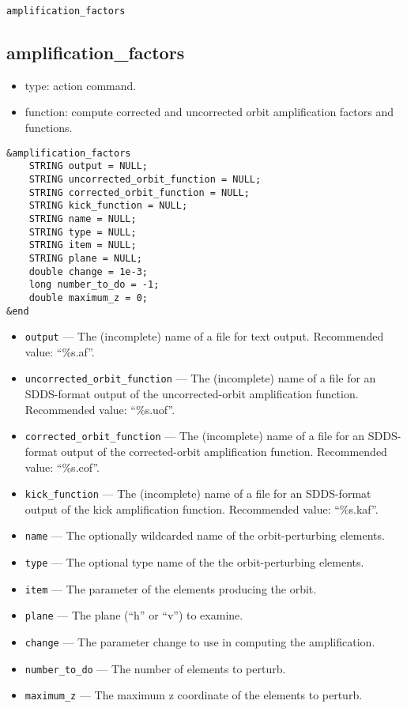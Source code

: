 \documentclass[11pt]{article}
\begin{document}
\begin{latexonly}
\newpage
\begin{center}{\Large\verb|amplification_factors|}\end{center}
\end{latexonly}
\subsection{amplification\_factors}

\begin{itemize}
\item type: action command.
\item function: compute corrected and uncorrected orbit amplification factors and functions.
\end{itemize}

\begin{verbatim}
&amplification_factors
    STRING output = NULL;
    STRING uncorrected_orbit_function = NULL;
    STRING corrected_orbit_function = NULL;
    STRING kick_function = NULL;
    STRING name = NULL;
    STRING type = NULL;
    STRING item = NULL;
    STRING plane = NULL;
    double change = 1e-3;
    long number_to_do = -1;
    double maximum_z = 0;
&end
\end{verbatim}

\begin{itemize}
\item \verb|output| ---  The (incomplete) name of a file for text output.   Recommended value: ``\%s.af''.
\item \verb|uncorrected_orbit_function| --- The (incomplete) name of a file for an SDDS-format output of the
    uncorrected-orbit amplification function.  Recommended value: ``\%s.uof''.
\item \verb|corrected_orbit_function| --- The (incomplete) name of a file for an SDDS-format output of the
    corrected-orbit amplification function.  Recommended value: ``\%s.cof''.
\item \verb|kick_function| --- The (incomplete) name of a file for an SDDS-format output of the kick amplification function.
Recommended value: ``\%s.kaf''.
\item \verb|name| --- The optionally wildcarded name of the orbit-perturbing elements.  
\item \verb|type| --- The optional type name of the the orbit-perturbing elements.
\item \verb|item| --- The parameter of the elements producing the orbit.
\item \verb|plane| --- The plane (``h'' or ``v'') to examine.
\item \verb|change| --- The parameter change to use in computing the amplification.  
\item \verb|number_to_do| --- The number of elements to perturb.
\item \verb|maximum_z| --- The maximum z coordinate of the elements to perturb.
\end{itemize}
\end{document}
